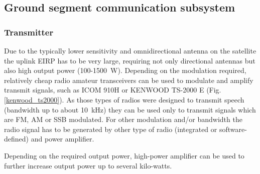 \subsection{Ground segment communication subsystem}
\subsubsection{Transmitter}
Due to the typically lower sensitivity and omnidirectional antenna on the satellite the uplink EIRP has to be very large, requiring not only directional antennas but also high output power (\si{100}-\SI{1500}{\watt}).
Depending on the modulation required, relatively cheap radio amateur transceivers can be used to modulate and amplify transmit signals, such as ICOM 910H or KENWOOD TS-2000 E (Fig. \ref{kenwood_ts2000}). As those types of radios were designed to transmit speech (bandwidth up to about \SI{10}{\kHz}) they can be used only to transmit signals which are FM, AM or SSB modulated. For other modulation and/or bandwidth the radio signal has to be generated by other type of radio (integrated or software-defined) and power amplifier.

Depending on the required output power, high-power amplifier can be used to further increase output power up to several kilo-watts. 

